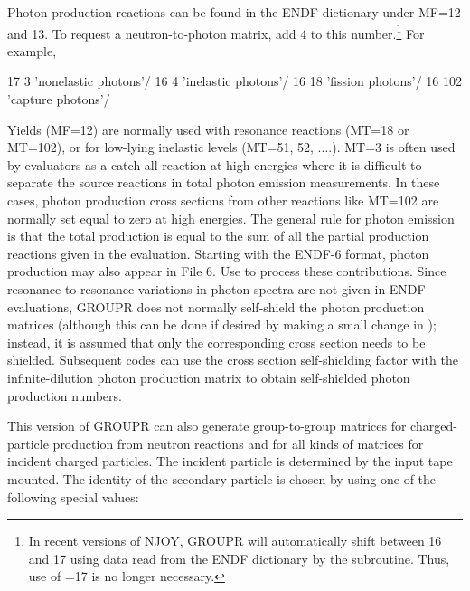 Photon production reactions can be found in the ENDF dictionary under
MF=12 and 13.  To request a neutron-to-photon matrix, add 4 to this
number.\footnote{In recent versions of NJOY, GROUPR will automatically
shift between 16 and 17 using data read from the ENDF dictionary by
the  subroutine.  Thus, use of =17 is no longer
necessary.}  For example,

\small
\begin{ccode}

   17   3 'nonelastic photons'/
   16   4 'inelastic photons'/
   16  18 'fission photons'/
   16 102 'capture photons'/

\end{ccode}
\normalsize

\noindent
Yields (MF=12) are normally used with resonance reactions (MT=18 or MT=102),
or for low-lying inelastic levels (MT=51, 52, ....).  MT=3 is often used
by evaluators as a catch-all reaction at high energies where it is
difficult to separate the source reactions in total photon emission
measurements.  In these cases, photon production cross sections from
other reactions like MT=102 are normally set equal to zero at high
energies.  The general rule for photon emission is that the total
production is equal to the sum of all the partial production reactions
given in the evaluation.   Starting with the ENDF-6 format, photon
production may also appear in File 6.  Use  to process
these contributions.  Since resonance-to-resonance variations in
photon spectra are not given in ENDF evaluations, GROUPR does not normally
self-shield the photon production matrices (although this can be done
if desired by making a small change in ); instead, it is
assumed that only the corresponding cross section needs to be shielded.
Subsequent codes can use the cross section self-shielding factor with the
infinite-dilution photon production matrix to obtain self-shielded photon
production numbers.

This version of GROUPR can also generate group-to-group matrices for
charged-particle production from neutron reactions and for all kinds
of matrices for incident charged particles.  The incident particle is
determined by the input tape mounted.  The identity of the secondary
particle is chosen by using one of the following special 
values:


